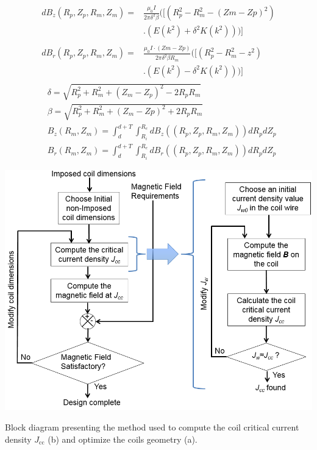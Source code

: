 \documentclass{ws-jmrr}
\begin{document}
\begin{multicols}{2}
\begin{align}
\begin{split}
dB_z(R_p,Z_p,R_m,Z_m) =&\frac{\mu _0I}{2\pi\delta ^{2}\beta  }( [ \left ( R_p^2-R_m ^2-(Zm-Zp)^2 \right )\\
&.(E(k^2)+\delta ^2K(k^2)) ) ]
\end{split}
\label{Bz1loop}\\
\begin{split}
dB_r(R_p,Z_p,R_m,Z_m) =&\frac{\mu _0 I \cdot (Zm-Zp)}{2\pi\delta ^{2}\beta R_m   }( [ \left ( R_p^2-R_m ^2-z^2 \right )\\
&.(E(k^2)-\delta ^2K(k^2))) ]
\end{split}
\end{align}
\begin{align}
&\delta =\sqrt{R_p^2+R_m^2+(Z_m-Z_p)^2-2R_pR_m}
\label{delta}\\
&\beta =\sqrt{R_p^2+R_m^2+(Z_m-Zp)^2+2R_pR_m}
\label{beta}\\
&B_z(R_m,Z_m)=\int_{d}^{d+T}\int_{R_i}^{R_e}dB_z((R_p,Z_p,R_m,Z_m))dR_pdZ_p\\
&B_r(R_m,Z_m)=\int_{d}^{d+T}\int_{R_i}^{R_e}dB_r((R_p,Z_p,R_m,Z_m))dR_pdZ_p
\end{align}
\begin{figurehere}
\begin{center}
	\includegraphics[width=\linewidth]{method.png}
	\caption{Block diagram presenting the method used to compute the coil critical current density $J_{\textrm{cc}}$ (b) and optimize the coils geometry (a).}
	\label{method}
	\end{center}
\end{figurehere}

\end{multicols}
\end{document}
